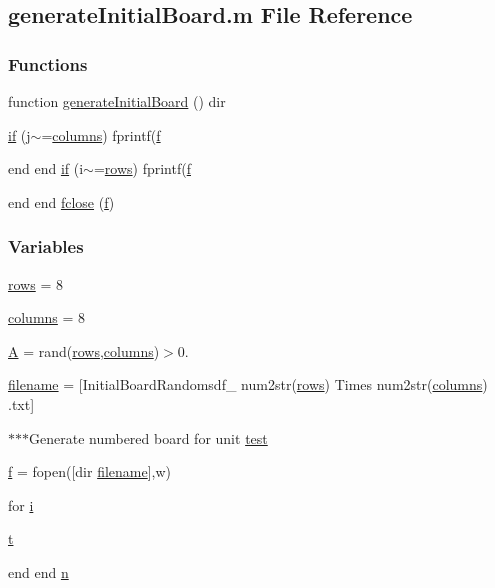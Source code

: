 \hypertarget{a00107}{}\subsection{generate\+Initial\+Board.\+m File Reference}
\label{a00107}
\subsubsection*{Functions}
\begin{DoxyCompactItemize}
\item 
function \hyperlink{a00107_ad750a7808e20a62df4fc83708ebbcbbb}{generate\+Initial\+Board} () dir
\item 
\hyperlink{a00107_a331f6ddeaf324600392c6d1f76374c4b}{if} (j$\sim$=\hyperlink{a00107_a616e3ce2d5365d3d3c41f5d00d4a1985}{columns}) fprintf(\hyperlink{a00107_a633de4b0c14ca52ea2432a3c8a5c4c31}{f}
\item 
end end \hyperlink{a00107_adaccd24104cadc8933e48c3a5569e23f}{if} (i$\sim$=\hyperlink{a00107_a74742cb5c8e2ac354a60cb73383d8176}{rows}) fprintf(\hyperlink{a00107_a633de4b0c14ca52ea2432a3c8a5c4c31}{f}
\item 
end end \hyperlink{a00107_a11dd0dea805474ae6b163150f213f12d}{fclose} (\hyperlink{a00107_a633de4b0c14ca52ea2432a3c8a5c4c31}{f})
\end{DoxyCompactItemize}
\subsubsection*{Variables}
\begin{DoxyCompactItemize}
\item 
\hyperlink{a00107_a74742cb5c8e2ac354a60cb73383d8176}{rows} = 8
\item 
\hyperlink{a00107_a616e3ce2d5365d3d3c41f5d00d4a1985}{columns} = 8
\item 
\hyperlink{a00107_a3b98e2dffc6cb06a89dcb0d5c60a0206}{A} = rand(\hyperlink{a00107_a74742cb5c8e2ac354a60cb73383d8176}{rows},\hyperlink{a00107_a616e3ce2d5365d3d3c41f5d00d4a1985}{columns})$>$0.
\item 
\hyperlink{a00107_a4a32877dda2cdbef8aa5f01eacc16f0c}{filename} = \mbox{[}\textquotesingle{}Initial\+Board\+Randomsdf\+\_\+\textquotesingle{} num2str(\hyperlink{a00107_a74742cb5c8e2ac354a60cb73383d8176}{rows}) \textquotesingle{}Times\textquotesingle{} num2str(\hyperlink{a00107_a616e3ce2d5365d3d3c41f5d00d4a1985}{columns}) \textquotesingle{}.txt\textquotesingle{}\mbox{]}
\item 
$\ast$$\ast$$\ast$Generate numbered board for unit \hyperlink{a00107_ab52c919104cfd3fd5aef89c5e39ec637}{test}
\item 
\hyperlink{a00107_a633de4b0c14ca52ea2432a3c8a5c4c31}{f} = fopen(\mbox{[}dir \hyperlink{a00107_a4a32877dda2cdbef8aa5f01eacc16f0c}{filename}\mbox{]},\textquotesingle{}w\textquotesingle{})
\item 
for \hyperlink{a00107_a6f6ccfcf58b31cb6412107d9d5281426}{i}
\item 
\hyperlink{a00107_aaccc9105df5383111407fd5b41255e23}{t}
\item 
end end \hyperlink{a00107_ae4e1b71ca84b7ff488e42aa1b6b485ce}{n}
\end{DoxyCompactItemize}


